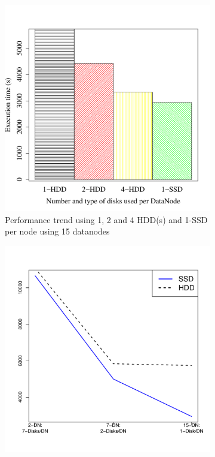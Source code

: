 \documentclass[conference]{IEEEtran}
\begin{document}
\begin{figure}[h]
  \centering
  \begin{subfigure}[b]{0.23\textwidth}
          \includegraphics[width=\textwidth]{Figure/PerormanceData/Plots/SSDHDDSameNode.pdf}
          \caption{Performance trend using 1, 2 and 4 HDD(s) and 1-SSD per node using 15 datanodes}
          \label{fig:SsdN4Hdd}
  \end{subfigure}
  \begin{subfigure}[b]{0.23\textwidth}
          \includegraphics[width=\textwidth]{Figure/PerormanceData/Plots/SSDHDDDiffNode.pdf}

\end{subfigure}
\end{figure}
\end{document}
